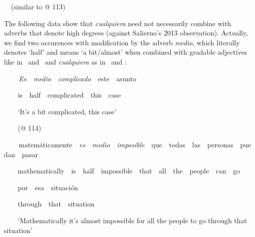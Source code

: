 \begin{styleStandard}
\ \ (similar to @ 113)
\end{styleStandard}

\begin{styleStandard}
The following data show that \textit{cualquiera }need not necessarily combine with adverbs that denote high degrees (against Salierno’s 2013 observation). Actually, we find two occurences with modification by the adverb \textit{medio}, which literally denotes ‘half’ and means ‘a bit/almost’ when combined with gradable adjectives like in \ and \ and \textit{cualquiera }as in \ and :
\end{styleStandard}

\begin{styleStandard}
\label{bkm:Ref150786427}\textbf{\ \ }\ \ \textit{Es\ \ medio\ \ complicado\ \ }este\ \ asunto
\end{styleStandard}

\begin{styleStandard}
\ \ \ \ is\ \ half\ \ complicated\ \ this\ \ case
\end{styleStandard}

\begin{styleStandard}
\ \ \ \ ‘It’s a bit complicated, this case’
\end{styleStandard}

\begin{styleStandard}
\ \ \ \ (@ 114)
\end{styleStandard}

\begin{styleStandard}
\label{bkm:Ref150786436}\textbf{\ \ }\ \ matemáticamente\ \ \textit{es\ \ medio\ \ imposible\ \ }que\ \ todas\ \ las\ \ personas\ \ puedan\ \ pasar
\end{styleStandard}

\begin{styleStandard}
\ \ \ \ mathematically\ \ is\ \ half\ \ impossible\ \ that\ \ all\ \ the\ \ people\ \ can\ \ go
\end{styleStandard}

\begin{styleStandard}
\ \ \ \ por\ \ esa\ \ situación
\end{styleStandard}

\begin{styleStandard}
\ \ \ \ through\ \ that\ \ situation
\end{styleStandard}

\begin{styleStandard}
\ \ \ \ ‘Mathematically it’s almost impossible for all the people to go through that situation’
\end{styleStandard}

